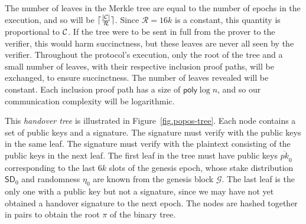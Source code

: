 The number of leaves in the Merkle tree are equal to the number of epochs in
the execution, and so will be $\lceil\frac{|\mathcal{C}|}{\mathcal{R}}\rceil$.
Since $\mathcal{R} = 16k$ is a constant, this quantity is proportional to
$\mathcal{C}$. If the tree were to be sent in full from the prover to the verifier,
this would harm succinctness, but these leaves are never all seen by the verifier.
Throughout the protocol's execution, only the
root of the tree and a small number of leaves, with their respective inclusion proof
paths, will be exchanged, to ensure succinctness. The number of leaves revealed will
be constant. Each inclusion proof path has a size of $\textsf{poly}\log n$, and so
our communication complexity will be logarithmic.

This \emph{handover tree} is illustrated in Figure~\ref{fig.popos-tree}.
Each node contains a set of public keys and a signature. The signature must verify
with the public keys in the same leaf. The signature must verify with the plaintext
consisting of the public keys in the next leaf. The first leaf in the tree must
have public keys $\overline{pk}_0$ corresponding to the last $6k$ slots of the
genesis epoch, whose stake distribution $\textsf{SD}_0$ and randomness $\eta_0$
are known from the genesis block $\mathcal{G}$. The last leaf is the only one
with a public key but not a signature, since we may have not yet obtained a handover
signature to the next epoch. The nodes are hashed together in pairs to obtain the
root $\pi$ of the binary tree.

